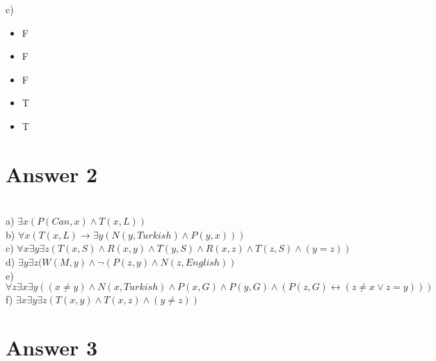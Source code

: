 \documentclass[12pt]{article}
\begin{document}
c)\\
\begin{itemize}
\centering
    \item F
    \item F
    \item F
    \item T
    \item T
\end{itemize}

\section*{Answer 2}

\hspace{5mm} \\
\hspace{5mm} a) $ \exists x (P(Can,x) \wedge T(x,L)) $\\
\hspace{5mm} b) $ \forall x (T(x,L) \rightarrow \exists y(N(y,Turkish) \wedge P(y,x))) $\\
\hspace{5mm} c) $ \forall x \exists y \exists z (T(x,S) \wedge R(x,y) \wedge T(y,S) \wedge R(x,z) \wedge T(z,S) \wedge (y=z))$\\
\hspace{5mm} d) $ \exists y \exists z (W(M,y) \wedge \neg (P(z,y) \wedge N(z,English))$\\
\hspace{5mm} e) $\forall z \exists x \exists y ((x \not=y) \wedge N(x,Turkish) \wedge P(x,G) \wedge P(y,G) \wedge (P(z,G) \leftrightarrow (z \not=x  \lor z=y )))$\\
\hspace{5mm} f) $ \exists x \exists y \exists z (T(x,y) \wedge T(x,z) \wedge (y \not=z))$\\


\section*{Answer 3}
\end{document}
